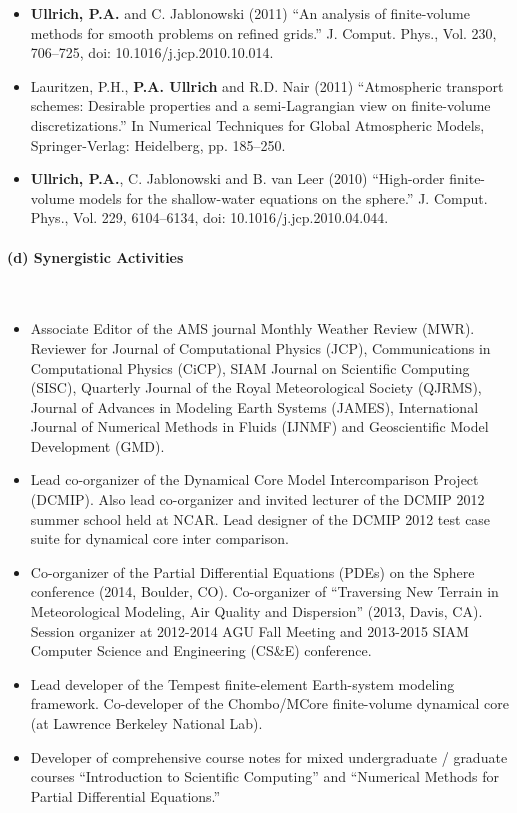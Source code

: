 \documentclass[11pt]{article}
\begin{document}
\begin{itemize}
\item \textbf{Ullrich, P.A.} and C. Jablonowski (2011) {``An analysis of finite-volume methods for smooth problems on refined grids.''} J. Comput. Phys., Vol. 230, 706--725, doi: 10.1016/j.jcp.2010.10.014.

\item Lauritzen, P.H., \textbf{P.A. Ullrich} and R.D. Nair (2011) ``Atmospheric transport schemes: Desirable properties and a semi-Lagrangian view on finite-volume discretizations.'' In Numerical Techniques for Global Atmospheric Models, Springer-Verlag: Heidelberg, pp. 185--250.

\item \textbf{Ullrich, P.A.}, C. Jablonowski and B. van Leer (2010) {``High-order finite-volume models for the shallow-water equations on the sphere.''}  J. Comput. Phys., Vol. 229, 6104--6134, doi: 10.1016/j.jcp.2010.04.044.
\end{itemize}

\vspace{-0.5cm}
\paragraph{\large (d) Synergistic Activities}\ \\
\vspace{-0.8cm}
\begin{itemize}
\item Associate Editor of the AMS journal Monthly Weather Review (MWR).  Reviewer for Journal of Computational Physics (JCP), Communications in Computational Physics (CiCP), SIAM Journal on Scientific Computing (SISC), Quarterly Journal of the Royal Meteorological Society (QJRMS), Journal of Advances in Modeling Earth Systems (JAMES), International Journal of Numerical Methods in Fluids (IJNMF) and Geoscientific Model Development (GMD).
\item Lead co-organizer of the Dynamical Core Model Intercomparison Project (DCMIP).  Also lead co-organizer and invited lecturer of the DCMIP 2012 summer school held at NCAR.  Lead designer of the DCMIP 2012 test case suite for dynamical core inter comparison.
\item Co-organizer of the Partial Differential Equations (PDEs) on the Sphere conference (2014, Boulder, CO).  Co-organizer of  ``Traversing New Terrain in Meteorological Modeling, Air Quality and Dispersion'' (2013, Davis, CA). Session organizer at 2012-2014 AGU Fall Meeting and 2013-2015 SIAM Computer Science and Engineering (CS\&E) conference.
\item Lead developer of the Tempest finite-element Earth-system modeling framework.  Co-developer of the Chombo/MCore finite-volume dynamical core (at Lawrence Berkeley National Lab).
\item Developer of comprehensive course notes for mixed undergraduate / graduate courses ``Introduction to Scientific Computing'' and ``Numerical Methods for Partial Differential Equations.''
\end{itemize}
\end{document}
